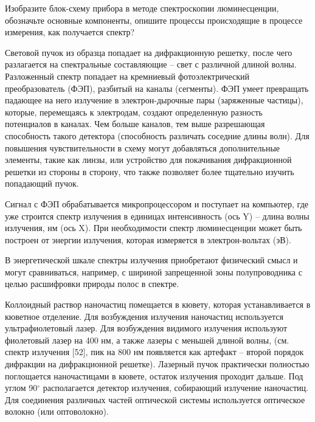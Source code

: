 
Изобразите блок-схему прибора в методе спектроскопии люминесценции, обозначьте основные компоненты, опишите процессы происходящие в процессе измерения, как получается спектр?

\explanationSection


Световой пучок из образца попадает на дифракционную решетку, после чего разлагается на спектральные составляющие – свет с различной длиной волны. Разложенный спектр попадает на кремниевый фотоэлектрический преобразователь (ФЭП), разбитый на каналы (сегменты).  ФЭП умеет превращать падающее на него излучение в электрон-дырочные пары (заряженные частицы), которые, перемещаясь к электродам, создают определенную разность потенциалов в каналах. Чем больше каналов, тем выше разрешающая способность такого детектора (способность различать соседние длины волн). Для повышения чувствительности в схему могут добавляться дополнительные элементы, такие как линзы, или устройство для покачивания дифракционной решетки из стороны в сторону, что также позволяет более тщательно изучить попадающий пучок.

Сигнал с ФЭП обрабатывается микропроцессором и поступает на компьютер, где уже строится спектр излучения в единицах интенсивность (ось Y) – длина волны излучения, нм (ось X). При необходимости спектр люминесценции может быть построен от энергии излучения, которая измеряется в электрон-вольтах (эВ). 

В энергетической шкале спектры излучения приобретают физический смысл и могут сравниваться, например, с шириной запрещенной зоны полупроводника с целью расшифровки природы полос в спектре.

Коллоидный раствор наночастиц помещается в кювету, которая устанавливается в кюветное отделение. Для возбуждения излучения наночастиц используется ультрафиолетовый лазер. Для возбуждения видимого излучения используют фиолетовый лазер на 400 нм, а также лазеры с меньшей длиной волны, (см. спектр излучения [52], пик на 800 нм появляется как артефакт – второй порядок дифракции на дифракционной решетке). Лазерный пучок практически полностью поглощается наночастицами в кювете, остаток излучения проходит дальше. Под углом 90$^\circ$ располагается детектор излучения, собирающий излучение наночастиц. Для соединения различных частей оптической системы используется оптическое волокно (или оптоволокно).
